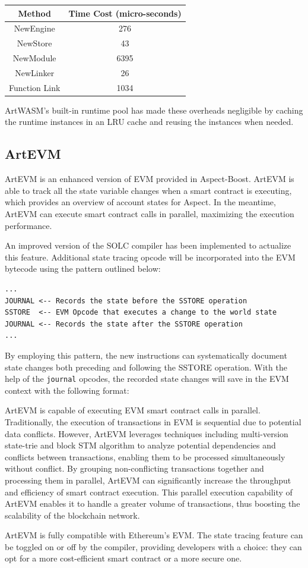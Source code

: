 \begin{center}
\begin{tabular}{|c|c|}
  \hline
  Method & Time Cost (micro-seconds) \\
  \hline
  NewEngine & 276 \\
  NewStore & 43 \\
  NewModule & 6395 \\
  NewLinker & 26 \\
  Function Link & 1034 \\
  \hline
\end{tabular}
\end{center}

ArtWASM's built-in runtime pool has made these overheads negligible by caching the runtime instances in an LRU cache and reusing the instances when needed.

\subsection{ArtEVM}

ArtEVM is an enhanced version of EVM provided in Aspect-Boost. ArtEVM is able to track all the state variable changes when a smart contract is executing, which provides an overview of account states for Aspect. In the meantime, ArtEVM can execute smart contract calls in parallel, maximizing the execution performance.

An improved version of the SOLC compiler has been implemented to actualize this feature. Additional state tracing opcode will be incorporated into the EVM bytecode using the pattern outlined below:

\begin{verbatim}
...
JOURNAL <-- Records the state before the SSTORE operation
SSTORE  <-- EVM Opcode that executes a change to the world state
JOURNAL <-- Records the state after the SSTORE operation
...
\end{verbatim}

By employing this pattern, the new instructions can systematically document state changes both preceding and following the SSTORE operation. With the help of the \texttt{journal} opcodes, the recorded state changes will save in the EVM context with the following format:

ArtEVM is capable of executing EVM smart contract calls in parallel. Traditionally, the execution of transactions in EVM is sequential due to potential data conflicts. However, ArtEVM leverages techniques including multi-version state-trie and block STM algorithm to analyze potential dependencies and conflicts between transactions, enabling them to be processed simultaneously without conflict. By grouping non-conflicting transactions together and processing them in parallel, ArtEVM can significantly increase the throughput and efficiency of smart contract execution. This parallel execution capability of ArtEVM enables it to handle a greater volume of transactions, thus boosting the scalability of the blockchain network.

ArtEVM is fully compatible with Ethereum's EVM. The state tracing feature can be toggled on or off by the compiler, providing developers with a choice: they can opt for a more cost-efficient smart contract or a more secure one.